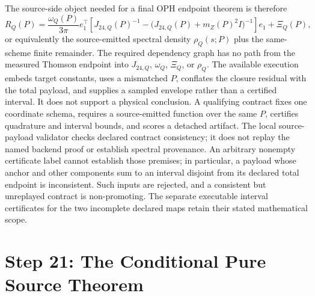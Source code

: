 \documentclass[11pt]{article}
\theoremstyle{remark}
\newcommand{\Rq}{R_Q}
\begin{document}
The source-side object needed for a final OPH endpoint theorem is therefore
\begin{equation}
\Rq(P)
=
\frac{\omega_Q(P)}{3\pi}
e_1^\top\!\left[
J_{24,Q}(P)^{-1}
-
\bigl(J_{24,Q}(P)+m_Z(P)^2I\bigr)^{-1}
\right]e_1
+\Xi_Q(P),
\label{eq:sourceJ24Q}
\end{equation}
or equivalently the source-emitted spectral density \(\rho_Q(s;P)\) plus the same-scheme finite
remainder. The required dependency graph has no path from the measured Thomson endpoint into
\(J_{24,Q}\), \(\omega_Q\), \(\Xi_Q\), or \(\rho_Q\). The available execution embeds target
constants, uses a mismatched \(P\), conflates the closure residual with the total payload, and
supplies a sampled envelope rather than a certified interval. It does not
support a physical conclusion.
A qualifying contract fixes one coordinate schema, requires a source-emitted function over the
same \(P\), certifies quadrature and interval bounds, and scores a detached artifact.
The local source-payload validator checks declared contract consistency;
it does not replay the named backend proof or establish spectral provenance.
An arbitrary nonempty certificate label cannot establish those premises;
in particular, a payload whose anchor and other components sum to an interval
disjoint from its declared total endpoint is inconsistent. Such inputs are
rejected, and a consistent but unreplayed contract is non-promoting. The separate
executable interval certificates for the two incomplete declared maps
retain their stated mathematical scope.

\section{Step 21: The Conditional Pure Source Theorem}
\end{document}
